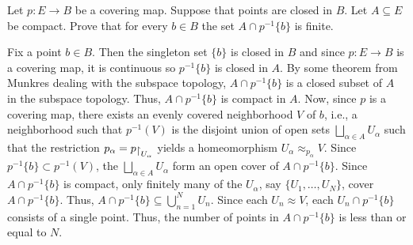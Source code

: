 \begin{problem}
  Let \(p\colon E\to B\) be a covering map. Suppose that points are closed
  in \(B\). Let \(A\subseteq E\) be compact. Prove that for every
  \(b\in B\) the set \(A\cap p^{-1}\{b\}\) is finite.
\end{problem}
\begin{solution}
  Fix a point \(b\in B\). Then the singleton set \(\{b\}\) is closed in
  \(B\) and since \(p\colon E\to B\) is a covering map, it is continuous so
  \(p^{-1}\{b\}\) is closed in \(A\). By some theorem from Munkres dealing
  with the subspace topology, \(A\cap p^{-1}\{b\}\) is a closed subset of
  \(A\) in the subspace topology. Thus, \(A\cap p^{-1}\{b\}\) is compact in
  \(A\). Now, since \(p\) is a covering map, there exists an evenly covered
  neighborhood \(V\) of \(b\), i.e., a neighborhood such that \(p^{-1}(V)\)
  is the disjoint union of open sets \(\bigsqcup_{\alpha\in A} U_\alpha\)
  such that the restriction \(p_\alpha=p\restrict{U_\alpha}\) yields a
  homeomorphism \(U_\alpha\approx_{p_\alpha} V\). Since
  \(p^{-1}\{b\}\subset p^{-1}(V)\), the \(\bigsqcup_{\alpha\in A}U_\alpha\)
  form an open cover of \(A\cap p^{-1}\{b\}\). Since \(A\cap p^{-1}\{b\}\)
  is compact, only finitely many of the \(U_\alpha\), say
  \(\{U_1,\dotsc,U_N\}\), cover \(A\cap p^{-1}\{b\}\). Thus,
  \(A\cap p^{-1}\{b\}\subseteq\bigcup_{n=1}^N U_n\). Since each
  \(U_n\approx V\), each \(U_n\cap p^{-1}\{b\}\) consists of a single
  point. Thus, the number of points in \(A\cap p^{-1}\{b\}\) is less than
  or equal to \(N\).
\end{solution}

